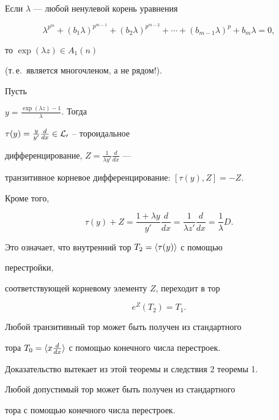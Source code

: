  


Если $\lambda$ --- любой ненулевой корень уравнения 


$$ 


\lambda^{p^m}+(b_1\lambda)^{p^{m-1}}+ 


(b_2\lambda)^{p^{m-2}}+\dotsb+(b_{m-1}\lambda)^p 


+b_m\lambda=0, 


$$ 


то $\exp(\lambda z)\in A_1(n)$ 


(т.\,е.~является многочленом, а не рядом!). 


Пусть 


$y=\frac{\exp(\lambda z)-1}{\lambda}$. Тогда 


$\tau(y)=\frac{y}{y'}\frac{d}{dx}\in\cal L_0$ -- тороидальное 


дифференцирование, $Z=\frac{1}{\lambda y'}\frac{d}{dx}$ --- 


транзитивное корневое дифференцирование: $[\tau(y),Z]=-Z$. 


Кроме того, 


$$ 


\tau(y)+Z=\frac{1+\lambda y}{y'}\frac{d}{dx}= 


\frac{1}{\lambda z'}\frac{d}{dx}=\frac{1}{\lambda}D. 


$$ 


Это означает, что внутренний тор $T_2=\langle\tau(y)\rangle$ с помощью 


перестройки, 


соответствующей корневому элементу $Z$, переходит в тор 


$$ 


e^Z(T_2)=T_1. 


$$ 


 


\begin{cor} Любой транзитивный тор может быть получен из стандартного 


тора $T_0=\langle x\frac{d}{dx}\rangle$ с помощью конечного числа перестроек. 


\end{cor} 


 


Доказательство вытекает из этой теоремы и следствия 2 теоремы 1. 


 


\begin{cor} Любой допустимый тор может быть получен из стандартного 


тора с помощью конечного числа перестроек. 


\end{cor} 


